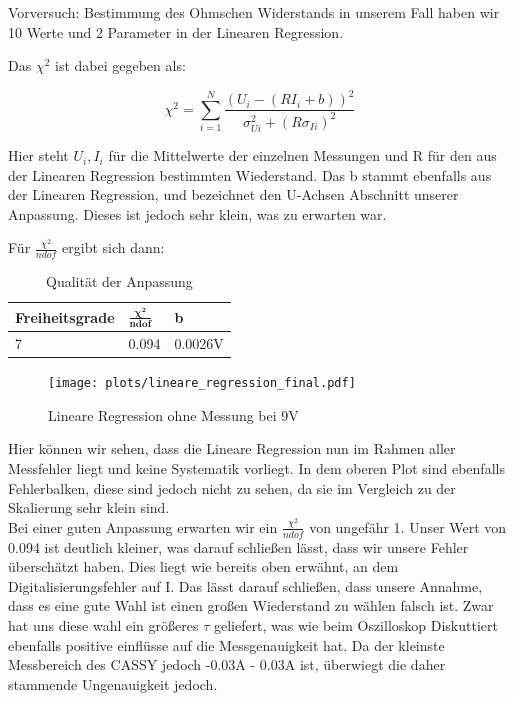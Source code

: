 \documentclass[twoside]{protokoll}
\begin{document}
\begin{aufgabe}{Vorversuch: Bestimmung des Ohmschen Widerstands}
in unserem Fall haben wir 10 Werte und 2 Parameter in der Linearen Regression.

Das $\chi^2$ ist dabei gegeben als:

\begin{equation}
	\chi^2 = \sum_{i=1}^N \frac{(U_i - (RI_i + b))^2}{\sigma_{Ui}^2+(R\sigma_{Ii})^2}
\end{equation}

Hier steht $ U_i , I_i $ für die Mittelwerte der einzelnen Messungen und R für den aus der Linearen Regression bestimmten Wiederstand. 
Das b stammt ebenfalls aus der Linearen Regression, und bezeichnet den U-Achsen Abschnitt unserer Anpassung. Dieses ist jedoch sehr klein, was zu erwarten war.
 
 Für $\frac{\chi^2}{ndof}$ ergibt sich dann:

\begin{table}[H]
    \centering
    \begin{tabularx}{0.6\textwidth}{X X X}
        \toprule
         \textbf{Freiheitsgrade}& $\pmb{\frac{\chi^2}{ndof}}$ & \textbf{b} \\
        \midrule
           7 & 0.094 & 0.0026V \\

        \bottomrule
    \end{tabularx}
    \caption{Qualität der Anpassung}
    \label{tab:mytable}
  \end{table}

 
 \begin{figure}[H]
  \centering
  \texttt{[image: plots/lineare\_regression\_final.pdf]}
  \caption{Lineare Regression ohne Messung bei 9V}
  \centering
  \end{figure}

Hier können wir sehen, dass die Lineare Regression nun im Rahmen aller Messfehler liegt und keine Systematik vorliegt.
In dem oberen Plot sind ebenfalls Fehlerbalken, diese sind jedoch nicht zu sehen, da sie im Vergleich zu der Skalierung sehr klein sind.\\

Bei einer guten Anpassung erwarten wir ein  $\frac{\chi^2}{ndof}$ von ungefähr 1. Unser Wert von 0.094 ist deutlich kleiner, was darauf schließen lässt, dass wir unsere Fehler überschätzt haben. 
Dies liegt wie bereits oben erwähnt, an dem Digitalisierungsfehler auf I. Das lässt darauf schließen, dass unsere Annahme, dass es eine gute Wahl ist einen großen Wiederstand zu wählen falsch ist. 
Zwar hat uns diese wahl ein größeres $\tau$ geliefert, was wie beim Oszilloskop Diskuttiert ebenfalls positive einflüsse auf die Messgenauigkeit hat. Da der kleinste Messbereich des CASSY jedoch -0.03A - 0.03A ist, überwiegt die daher stammende Ungenauigkeit jedoch.



\end{aufgabe}
\end{document}
